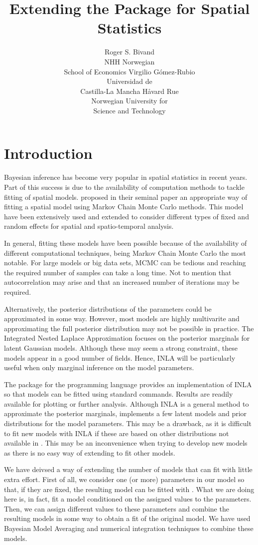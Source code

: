 \documentclass[article]{jss}
\author{Roger S. Bivand\\NHH Norwegian\\ School of Economics \And 
Virgilio G\'omez-Rubio\\Universidad de\\ Castilla-La Mancha 
\And H\r{a}vard Rue\\Norwegian University for\\ Science and Technology
}
\title{Extending the \pkg{R-INLA} Package for Spatial Statistics}
\begin{document}
\section[Introduction]{Introduction}


Bayesian inference has become very popular in spatial statistics in recent
years. Part of this success is due to the availability of computation methods
to tackle fitting of spatial models. \citet{besagetal:1991} proposed in their
seminal paper an appropriate way of fitting a spatial model using Markov Chain
Monte Carlo methods. This model have been extensively used and extended to
consider different types of fixed and random effects for spatial and
spatio-temporal analysis.

In general, fitting these models have been possible because of the availability
of different computational techniques, being Markov Chain Monte Carlo the most
notable. For large models or big data sets, MCMC can be tedious and reaching
the required number of samples can take a long time. Not to mention that
autocorrelation may arise and that an increased number of iterations may be
required.

Alternatively, the posterior distributions of the parameters could be
approximated in some way. However, most models are highly multivarite and
approximating the full posterior distribution may not be possible in practice.
The Integrated Nested Laplace Approximation \citep[][INLA]{isi:000264374200002} focuses on
the posterior marginals for latent Gaussian models. Although these may seem
a strong constraint, these models appear in a good number of fields. 
Hence, INLA will be particularly useful when  only
marginal inference on the model parameters.

The  package for the  programming language provides
an implementation of INLA so that models can be fitted using standard 
 commands. Results are readily available for plotting or
further analysis. Although INLA is a general method to approximate the
posterior marginals,  implements a few latent models and prior
distributions for the model parameters.
This may be a drawback, as it is difficult to fit new models with INLA if these
are based on other distributions not available in .  This may be an
inconvenience when trying to develop new models as there is no easy way of
extending  to fit other models.

We have deivsed a way of extending the number of models that  can
fit with little extra effort. First of all, we consider one (or more)
parameters in our model so that, if they are fixed, the resulting model can be
fitted with . What we are doing here is, in fact, fit a model
conditioned on the assigned values to the parameters. Then, we can assign
different values to these parameters and combine the resulting models in some
way to obtain a fit of the original model. We have used Bayesian Model
Averaging and numerical integration techniques to combine these models.
\end{document}
